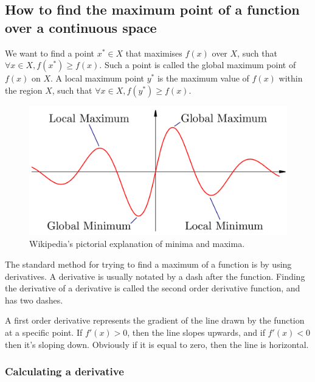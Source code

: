 \subsection{How to find the maximum point of a function over a continuous space}

We want to find a point $x^* \in X$ that maximises $f(x)$ over $X$, such that
$\forall x \in X, f(x^*) \geq f(x)$. Such a point is called the global maximum
point of $f(x)$ on $X$. A local maximum point $y^*$ is the maximum value of
$f(x)$ within the region $X$, such that $\forall x \in X, f(y^*) \geq f(x)$.

\begin{figure}
  \centering
  \includegraphics[width=\textwidth]{images/maxima}
  \caption{Wikipedia's pictorial explanation of minima and maxima.}
  \label{fig:maxima}
\end{figure}

The standard method for trying to find a maximum of a function is by using
derivatives. A derivative is usually notated by a dash after the function.
Finding the derivative of a derivative is called the second order derivative
function, and has two dashes.

A first order derivative represents the gradient of the line drawn by the
function at a specific point. If $f'(x) > 0$, then the line slopes upwards, and
if $f'(x) < 0$ then it's sloping down. Obviously if it is equal to zero, then
the line is horizontal.


\subsubsection{Calculating a derivative}


